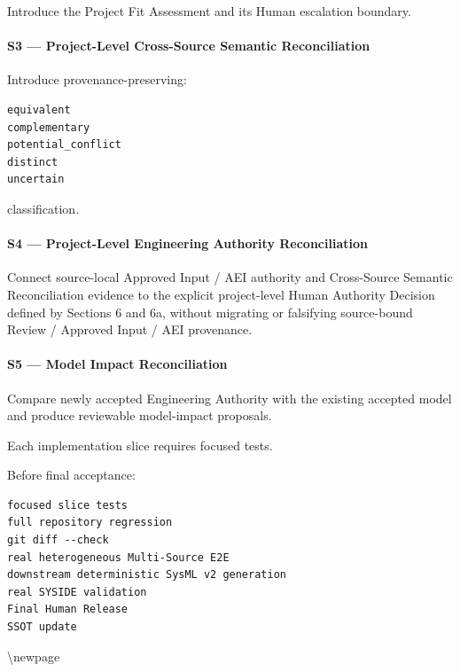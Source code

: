 Introduce the Project Fit Assessment and its Human escalation boundary.

\hypertarget{s3--project-level-cross-source-semantic-reconciliation}{%
\paragraph{S3 --- Project-Level Cross-Source Semantic Reconciliation}\label{s3--project-level-cross-source-semantic-reconciliation}}

Introduce provenance-preserving:

\begin{verbatim}
equivalent
complementary
potential_conflict
distinct
uncertain
\end{verbatim}

classification.

\hypertarget{s4--project-level-engineering-authority-reconciliation}{%
\paragraph{S4 --- Project-Level Engineering Authority Reconciliation}\label{s4--project-level-engineering-authority-reconciliation}}

Connect source-local Approved Input / AEI authority and Cross-Source Semantic Reconciliation evidence to the explicit project-level Human Authority Decision defined by Sections 6 and 6a, without migrating or falsifying source-bound Review / Approved Input / AEI provenance.

\hypertarget{s5--model-impact-reconciliation}{%
\paragraph{S5 --- Model Impact Reconciliation}\label{s5--model-impact-reconciliation}}

Compare newly accepted Engineering Authority with the existing accepted model and produce reviewable model-impact proposals.

Each implementation slice requires focused tests.

Before final acceptance:

\begin{verbatim}
focused slice tests
full repository regression
git diff --check
real heterogeneous Multi-Source E2E
downstream deterministic SysML v2 generation
real SYSIDE validation
Final Human Release
SSOT update
\end{verbatim}

\textbackslash newpage


